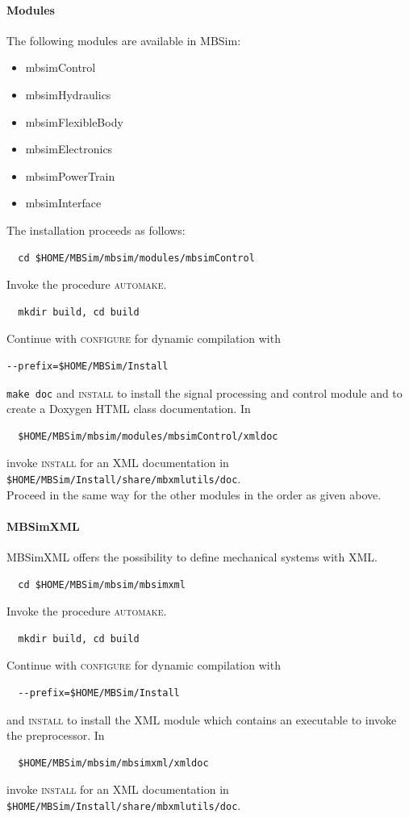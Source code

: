 \paragraph{Modules}
The following modules are available in MBSim:
%
\begin{itemize}
  \item mbsimControl
  \item mbsimHydraulics
  \item mbsimFlexibleBody
  \item mbsimElectronics
  \item mbsimPowerTrain
  \item mbsimInterface
\end{itemize}
%
The installation proceeds as follows:
\begin{verbatim}
  cd $HOME/MBSim/mbsim/modules/mbsimControl
\end{verbatim}
Invoke the procedure \textsc{automake}.
\begin{verbatim}
  mkdir build, cd build
\end{verbatim}
Continue with \textsc{configure} for dynamic compilation with
\begin{verbatim}
--prefix=$HOME/MBSim/Install
\end{verbatim}
\texttt{make doc} and \textsc{install} to install the signal processing and control module and to create a Doxygen HTML class documentation. In 
\begin{verbatim}
  $HOME/MBSim/mbsim/modules/mbsimControl/xmldoc
\end{verbatim}
invoke \textsc{install} for an XML documentation in\\
\texttt{\$HOME/MBSim/Install/share/mbxmlutils/doc}.\\
%
Proceed in the same way for the other modules in the order as given above.
%
\paragraph{MBSimXML}
MBSimXML offers the possibility to define mechanical systems with XML.
\begin{verbatim}
  cd $HOME/MBSim/mbsim/mbsimxml
\end{verbatim}
Invoke the procedure \textsc{automake}.
\begin{verbatim}
  mkdir build, cd build
\end{verbatim}
Continue with \textsc{configure} for dynamic compilation with
\begin{verbatim}
  --prefix=$HOME/MBSim/Install
\end{verbatim}
and \textsc{install} to install the XML module which contains an executable to invoke the preprocessor. In
\begin{verbatim}
  $HOME/MBSim/mbsim/mbsimxml/xmldoc
\end{verbatim}
invoke \textsc{install} for an XML documentation in\\
\texttt{\$HOME/MBSim/Install/share/mbxmlutils/doc}.
%
